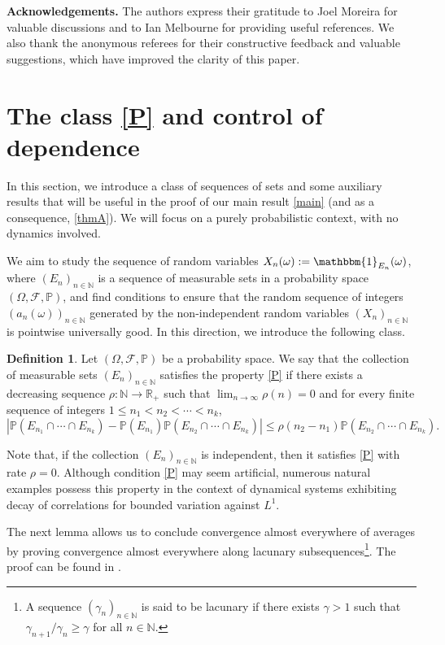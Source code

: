 \documentclass[11pt]{amsart}
\numberwithin{equation}{section}
\theoremstyle{definition}
\newtheorem{definition}[lemma]{Definition}
\theoremstyle{plain}
\newcommand{\N}{{\mathbb N}}
\begin{document}
\textbf{Acknowledgements.} The authors express their gratitude to Joel Moreira for valuable discussions and to Ian Melbourne for providing useful references. We also thank the anonymous referees for their constructive feedback and valuable suggestions, which have improved the clarity of this paper.

\section{The class \eqref{P} and control of dependence}

 In this section, we introduce a class of sequences of sets and some auxiliary results that will be useful in the proof of our main result \cref{main} (and as a consequence, \cref{thmA}). We will focus on a purely probabilistic context, with no dynamics involved. 
 
We aim to study the sequence of random variables $X_n(\omega):=\mathbbm{1}_{E_n}(\omega)$, where $(E_n)_{n\in \N}$ is a sequence of measurable sets in a probability space $(\Omega,\mathcal{F},\mathbb{P})$, and find conditions to ensure that the random sequence of integers $(a_n(\omega))_{n\in\N}$ generated by the non-independent random variables $(X_n)_{n\in \N}$ is pointwise universally good. In this direction, we introduce the following class.

 \begin{definition} Let $(\Omega,\mathcal{F},\mathbb{P})$ be a probability space. We say that the collection of measurable sets $(E_n)_{n\in\N}$ satisfies the property \eqref{P} if there exists a decreasing sequence $\rho:\N\to \mathbb{R}_{+}$  such that $\displaystyle \lim_{n\to\infty}\rho(n)=0$ and  for every finite sequence of integers $1 \leq n_1<n_2<\cdots<n_k$,
 \begin{equation}
     \left|\mathbb{P}(E_{n_1} \cap \cdots \cap E_{n_k})-\mathbb{P}(E_{n_1})\mathbb{P}(E_{n_2}\cap \cdots \cap E_{n_k})\right|\leq \rho(n_2-n_1)\mathbb{P}(E_{n_2}\cap \cdots \cap E_{n_k}).  \tag{P}\label{P}
 \end{equation}
 \end{definition}
 \medskip
 Note that, if the collection $(E_n)_{n \in \N}$ is independent, then it satisfies \eqref{P} with rate $\rho=0$. Although condition \eqref{P} may seem artificial, numerous natural examples possess this property in the context of dynamical systems exhibiting decay of correlations for bounded variation against $L^1$.  

 
 
 The next lemma allows us to conclude convergence almost everywhere of averages by proving convergence almost everywhere along lacunary subsequences\footnote{A sequence $(\gamma_n)_{n\in\N}$ is said to be lacunary if there exists $\gamma>1$ such that $\gamma_{n+1}/\gamma_n\geq \gamma$ for all $n\in \N$.}. The proof can be found in \cite[Corollary A.2]{Frantzikinakis_Lesigne_Wierdl}.
\end{document}
